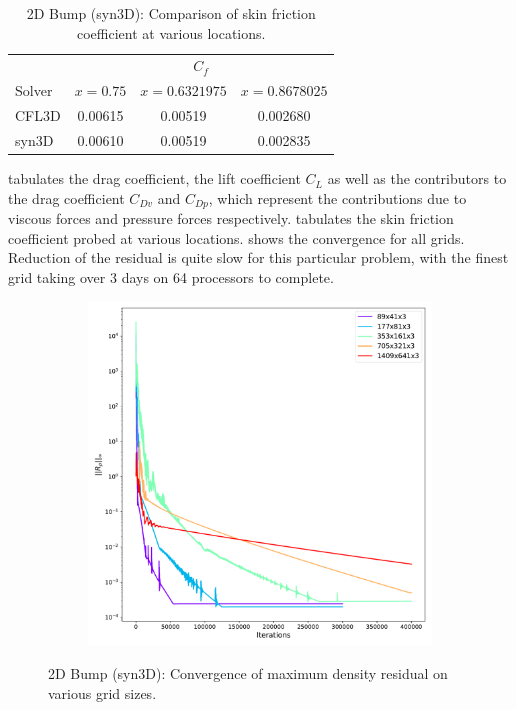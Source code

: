 \begin{table}[ht!]
\centering
\caption{2D Bump (syn3D): Comparison of skin friction coefficient at various locations.}
\label{tab:syn2dbump2}
\begin{tabular}{lccc}
\toprule
& \multicolumn{3}{c}{$C_f$} \\
\cline{2-4}
Solver & $x=0.75$ & $x=0.6321975$ & $x=0.8678025$ \\  
\midrule
CFL3D & 0.00615 & 0.00519  & 0.002680   \\
syn3D & 0.00610 & 0.00519  & 0.002835  \\
\bottomrule
\end{tabular}

\end{table}

 tabulates the drag coefficient, the lift coefficient $C_L$ as well as the contributors to the drag coefficient $C_{Dv}$ and $C_{Dp}$, which represent the contributions due to viscous forces and pressure forces respectively.  tabulates the skin friction coefficient probed at various locations.  shows the convergence for all grids. Reduction of the residual is quite slow for this particular problem, with the finest grid taking over 3 days on 64 processors to complete.
\begin{figure}[ht!]
\centering
\begin{subfigure}{.45\textwidth}
  \centering
  \includegraphics[width=1.0\textwidth]{figs/2dbump/convergenceRho.pdf}
\end{subfigure}%
\caption{2D Bump (syn3D): Convergence of maximum density residual on various grid sizes.}
\label{fig:syn2dbumpcnvstudy}
\end{figure}

